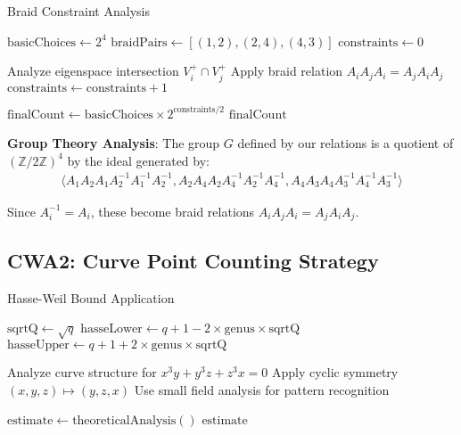 \documentclass[11pt]{article}
\begin{document}
\begin{algorithm}[H]
\caption{Braid Constraint Analysis}
\begin{algorithmic}[1]
    \State $\text{basicChoices} \leftarrow 2^4$ 
    \State $\text{braidPairs} \leftarrow [(1,2), (2,4), (4,3)]$
    \State $\text{constraints} \leftarrow 0$
    
        \State Analyze eigenspace intersection $V_i^+ \cap V_j^+$
        \State Apply braid relation $A_i A_j A_i = A_j A_i A_j$
        \State $\text{constraints} \leftarrow \text{constraints} + 1$
    \EndFor
    
    \State $\text{finalCount} \leftarrow \text{basicChoices} \times 2^{\text{constraints}/2}$
    \Return $\text{finalCount}$
\EndProcedure
\end{algorithmic}
\end{algorithm}

\textbf{Group Theory Analysis}:
The group $G$ defined by our relations is a quotient of $(\mathbb{Z}/2\mathbb{Z})^4$ by the ideal generated by:
\begin{align}
\langle A_1 A_2 A_1 A_2^{-1} A_1^{-1} A_2^{-1}, A_2 A_4 A_2 A_4^{-1} A_2^{-1} A_4^{-1}, A_4 A_3 A_4 A_3^{-1} A_4^{-1} A_3^{-1} \rangle
\end{align}

Since $A_i^{-1} = A_i$, these become braid relations $A_i A_j A_i = A_j A_i A_j$.

\subsection{CWA2: Curve Point Counting Strategy}

\begin{algorithm}[H]
\caption{Hasse-Weil Bound Application}
\begin{algorithmic}[1]
    \State $\text{sqrtQ} \leftarrow \sqrt{q}$
    \State $\text{hasseLower} \leftarrow q + 1 - 2 \times \text{genus} \times \text{sqrtQ}$
    \State $\text{hasseUpper} \leftarrow q + 1 + 2 \times \text{genus} \times \text{sqrtQ}$
    
    \State Analyze curve structure for $x^3y + y^3z + z^3x = 0$
    \State Apply cyclic symmetry $(x,y,z) \mapsto (y,z,x)$
    \State Use small field analysis for pattern recognition
    
    \State $\text{estimate} \leftarrow \text{theoreticalAnalysis}()$
    \Return $\text{estimate}$
\EndProcedure
\end{algorithmic}
\end{algorithm}
\end{document}
